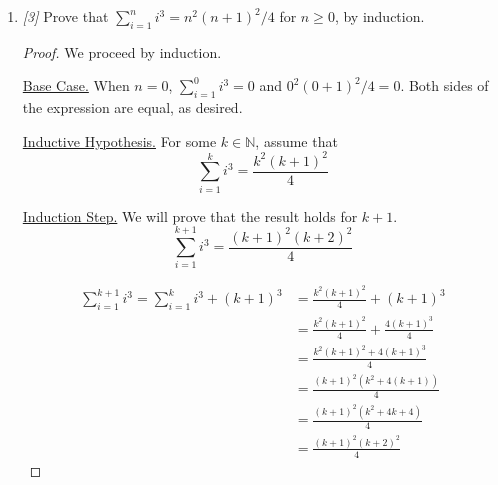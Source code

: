 \documentclass[10pt, letterpaper]{article}
\numberwithin{equation}{section}
\begin{document}
\begin{enumerate}
\begin{proof}
            \begin{align*}
                \sum_{i = 1}^{k + 1} i^2 = \sum_{i = 1}^{k} i^2 + (k + 1)^2
                & = \frac{k(k + 1)(2k + 1)}{6} + (k + 1)^2 \\
                & = \frac{k(k + 1)(2k + 1)}{6} + \frac{6(k + 1)^2}{6} \\
                & = \frac{k(k + 1)(2k + 1) + 6(k + 1)^2}{6} \\
                & = \frac{(k + 1)(k(2k + 1) + 6(k + 1))}{6} \\
                & = \frac{(k + 1)(2k^2 + 7k + 6)}{6} \\
                & = \frac{(k + 1)(k + 2)(2k + 3)}{6}
            \end{align*}

            \underline{Conclusion.} Therefore, by induction,
            $\sum_{i = 1}^{n} i^2 = n(n + 1)(2n + 1) / 6$ for $n \geq 0$.
        \end{proof}

        \item \textit{[3]} Prove that $\sum_{i = 1}^{n} i^3 = n^2(n + 1)^2 / 4$ for $n \geq 0$, by
        induction.

        \begin{proof}
            We proceed by induction.

            \underline{Base Case.} When $n = 0$, $\sum_{i = 1}^{0} i^3 = 0$ and
            $0^2(0 + 1)^2 / 4 = 0$. Both sides of the expression are equal, as desired.

            \underline{Inductive Hypothesis.} For some $k \in \mathbb{N}$, assume that
            \begin{equation*}
                \sum_{i = 1}^{k} i^3 = \frac{k^2(k + 1)^2}{4}
            \end{equation*}

            \underline{Induction Step.} We will prove that the result holds for $k + 1$.
            \begin{equation*}
                \sum_{i = 1}^{k + 1} i^3 = \frac{(k + 1)^2(k + 2)^2}{4}
            \end{equation*}

            \begin{align*}
                \sum_{i = 1}^{k + 1} i^3 = \sum_{i = 1}^{k} i^3 + (k + 1)^3
                & = \frac{k^2(k + 1)^2}{4} + (k + 1)^3 \\
                & = \frac{k^2(k + 1)^2}{4} + \frac{4(k + 1)^3}{4} \\
                & = \frac{k^2(k + 1)^2 + 4(k + 1)^3}{4} \\
                & = \frac{(k + 1)^2(k^2 + 4(k + 1))}{4} \\
                & = \frac{(k + 1)^2(k^2 + 4k + 4)}{4} \\
                & = \frac{(k + 1)^2(k + 2)^2}{4}
            \end{align*}


\end{proof}
\end{enumerate}
\end{document}
